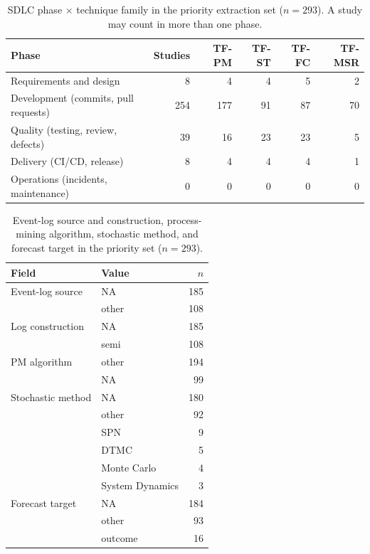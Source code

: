 \documentclass[preprint,12pt,authoryear=false]{elsarticle}
\newcommand{\PM}{TF-PM}
\newcommand{\ST}{TF-ST}
\newcommand{\FC}{TF-FC}
\newcommand{\MSR}{TF-MSR}
\begin{document}
\begin{table}[t]
\centering\small
\caption{SDLC phase $\times$ technique family in the priority extraction set ($n = 293$). A study may count in more than one phase.}
\label{tab:rq3-sdlc}
\begin{tabular}{lrrrrr}
\toprule
Phase & Studies & \PM{} & \ST{} & \FC{} & \MSR{} \\
\midrule
Requirements and design & 8 & 4 & 4 & 5 & 2 \\
Development (commits, pull requests) & 254 & 177 & 91 & 87 & 70 \\
Quality (testing, review, defects) & 39 & 16 & 23 & 23 & 5 \\
Delivery (CI/CD, release) & 8 & 4 & 4 & 4 & 1 \\
Operations (incidents, maintenance) & 0 & 0 & 0 & 0 & 0 \\
\bottomrule
\end{tabular}
\end{table}

\begin{table}[t]
\centering\small
\caption{Event-log source and construction, process-mining algorithm, stochastic method, and forecast target in the priority set ($n = 293$).}
\label{tab:rq3-tech}
\footnotesize
\begin{tabular}{llr}
\toprule
Field & Value & $n$ \\
\midrule
Event-log source & NA & 185 \\
 & other & 108 \\
Log construction & NA & 185 \\
 & semi & 108 \\
PM algorithm & other & 194 \\
 & NA & 99 \\
Stochastic method & NA & 180 \\
 & other & 92 \\
 & SPN & 9 \\
 & DTMC & 5 \\
 & Monte Carlo & 4 \\
 & System Dynamics & 3 \\
Forecast target & NA & 184 \\
 & other & 93 \\
 & outcome & 16 \\
\bottomrule
\end{tabular}
\end{table}
\end{document}

